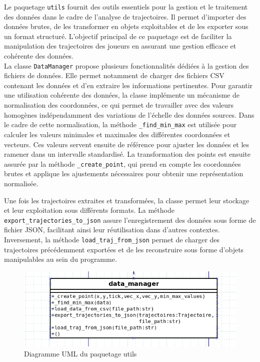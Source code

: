 \documentclass{article}
\begin{document}
        Le paquetage \texttt{utils} fournit des outils essentiels pour la gestion et le traitement des données dans le cadre de l'analyse de trajectoires. Il permet d'importer des données brutes, de les transformer en objets exploitables et de les exporter sous un format structuré. L'objectif principal de ce paquetage est de faciliter la manipulation des trajectoires des joueurs en assurant une gestion efficace et cohérente des données.\\  
        
        La classe \texttt{DataManager} propose plusieurs fonctionnalités dédiées à la gestion des fichiers de données. Elle permet notamment de charger des fichiers CSV contenant les données et d'en extraire les informations pertinentes. Pour garantir une utilisation cohérente des données, la classe implémente un mécanisme de normalisation des coordonnées, ce qui permet de travailler avec des valeurs homogènes indépendamment des variations de l’échelle des données sources.  
        Dans le cadre de cette normalisation, la méthode \texttt{\_find\_min\_max} est utilisée pour calculer les valeurs minimales et maximales des différentes coordonnées et vecteurs. Ces valeurs servent ensuite de référence pour ajuster les données et les ramener dans un intervalle standardisé. La transformation des points est ensuite assurée par la méthode \texttt{\_create\_point}, qui prend en compte les coordonnées brutes et applique les ajustements nécessaires pour obtenir une représentation normalisée.  
        
        Une fois les trajectoires extraites et transformées, la classe permet leur stockage et leur exploitation sous différents formats. La méthode \texttt{export\_trajectories\_to\_json} assure l'enregistrement des données sous forme de fichier JSON, facilitant ainsi leur réutilisation dans d'autres contextes. Inversement, la méthode \texttt{load\_traj\_from\_json} permet de charger des trajectoires précédemment exportées et de les reconstruire sous forme d'objets manipulables au sein du programme.  
            \begin{figure}[H]
                \centering
                \includegraphics[scale=0.40]{img/utils.png}
                \caption{Diagramme UML du paquetage utils}
                \label{Diagramme_utils}
            \end{figure}
\end{document}
